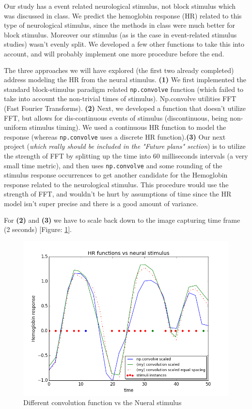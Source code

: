 \par  \indent Our study has a event related neurological stimulus, not block stimulus which was discussed in class. We predict the hemoglobin response (HR) related to this type of neurological stimulus, since the methods in class were much better for block stimulus. Moreover our stimulus (as is the case in event-related stimulus studies) wasn't evenly split. We developed a few other functions to take this into account, and will probably implement one more procedure before the end.

\par  The three approaches we will have explored (the first two already completed) address modeling the HR from the neural stimulus. \textbf{(1)} We first implemented the standard block-stimulus paradigm related \texttt{np.convolve} function (which failed to take into account the non-trivial times of stimulus). Np.convolve utilities FFT (Fast Fourier Transforms). \textbf{(2)} Next, we developed a function that doesn't utilize FFT, but allows for dis-continuous events of stimulus (discontinuous, being non-uniform stimulus timing). We used a continuous HR function to model the response (whereas \texttt{np.convolve} uses a discrete HR function).\textbf{(3)} Our next project (\textit{which really should be included in the "Future plans" section}) is to utilize the strength of FFT by splitting up the time into 60 milliseconds intervals (a very small time metric), and then uses \texttt{np.convolve} and some rounding of the stimulus response occurrences to get another candidate for the Hemoglobin response related to the neurological stimulus. This procedure would use the strength of FFT, and wouldn't be hurt by assumptions of time since the HR model isn't super precise and there is a good amount of variance.
    
\par   For \textbf{(2)} and \textbf{(3)} we have to scale back down to the image capturing time frame (2 seconds) [Figure: \ref{fig:convolution}].


\begin{figure}[ht]
\centering
\includegraphics[scale=0.5]{images/convolution_vs_neural_stimulus} 
\caption{Different convolution function vs the Nueral stimulus}
\label{fig:convolution}
\end{figure}

